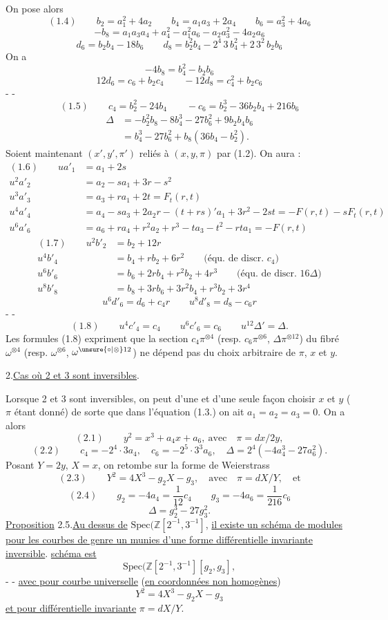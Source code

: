 On pose alors
\[
(1.4)\qquad b_2=a_1^2+4a_2\qquad b_4=a_1a_3+2a_4\qquad b_6=a_3^2+4a_6
\]
\[
-b_8=a_1a_3a_4+a_4^2-a_1^2a_6-a_2a_3^2-4a_2a_6
\]
\[
d_6=b_2b_4-18b_6\qquad d_8=b_2^2b_4-2^4\,3\,b_4^2+2\,3^2\,b_2b_6
\]
On a
\[
-4b_8=b_4^2-b_2b_6
\]
\[
12d_6=c_6+b_2c_4\qquad -12d_8=c_4^2+b_2c_6
\]
-  -
\[
(1.5)\qquad c_4=b_2^2-24b_4\qquad -c_6=b_2^3-36b_2b_4+216b_6
\]
\[
\begin{aligned}
\Delta&=-b_2^2b_8-8b_4^3-27b_6^2+9b_2b_4b_6\\
&=b_4^3-27b_6^2+b_8(36b_4-b_2^2).
\end{aligned}
\]
Soient maintenant $(x',y',\pi')$ reliés à $(x,y,\pi)$ par (1.2). On aura :
\[
\begin{aligned}
(1.6)\qquad ua'_1&=a_1+2s\\
u^2a'_2&=a_2-sa_1+3r-s^2\\
u^3a'_3&=a_3+ra_1+2t=F_t(r,t)\\
u^4a'_4&=a_4-sa_3+2a_2r-(t+rs)'a_1+3r^2-2st=-F(r,t)-sF_t(r,t)\\
u^6a'_6&=a_6+ra_4+r^2a_2+r^3-ta_3-t^2-rta_1=-F(r,t)
\end{aligned}
\]
\[
\begin{aligned}
(1.7)\qquad u^2b'_2&=b_2+12r\\
u^4b'_4&=b_4+rb_2+6r^2\qquad\text{(équ. de discr. }c_4\text{)}\\
u^6b'_6&=b_6+2rb_4+r^2b_2+4r^3\qquad\text{(équ. de discr. }16\Delta\text{)}\\
u^8b'_8&=b_8+3rb_6+3r^2b_4+r^3b_2+3r^4
\end{aligned}
\]
\[
u^6d'_6=d_6+c_4r\qquad u^8d'_8=d_8-c_6r
\]
-  -
\[
(1.8)\qquad u^4c'_4=c_4\qquad u^6c'_6=c_6\qquad u^{12}\Delta'=\Delta.
\]
Les formules (1.8) expriment que la section $c_4\pi^{\otimes4}$ (resp. $c_6\pi^{\otimes6}$,  $\Delta\pi^{\otimes12}$) du fibré $\omega^{\otimes4}$ (resp. $\omega^{\otimes6}$, $\omega^{\unsure{\circ|\otimes}12}$) ne dépend pas du choix arbitraire de $\pi$, $x$ et $y$.

2.\quad \uline{Cas où 2 et 3 sont inversibles}.

Lorsque 2 et 3 sont inversibles, on peut d'une et d'une seule façon choisir $x$ et $y$ ($\pi$ étant donné) de sorte que dans l'équation (1.3.) on ait $a_1=a_2=a_3=0$. On a alors
\[
(2.1)\qquad y^2=x^3+a_4x+a_6,\ \text{avec}\quad\pi=dx/2y,
\]
\[
(2.2)\qquad c_4=-2^4\cdot3a_4,\quad c_6=-2^5\cdot3^3a_6,\quad\Delta=2^4(-4a_4^3-27a_6^2).
\]
Posant $Y=2y$, $X=x$, on retombe sur la forme de Weierstrass
\[
(2.3)\qquad Y^2=4X^3-g_2X-g_3,\quad\text{avec}\quad\pi=dX/Y,\quad\text{et}
\]
\[
(2.4)\qquad g_2=-4a_4=\frac1{12}c_4\qquad g_3=-4a_6=\frac1{216}c_6
\]
\[
\Delta=g_2^3-27g_3^2.
\]
\uline{Proposition} 2.5.\quad \uline{Au dessus de} $\mathrm{Spec}(\mathbb Z[2^{-1},3^{-1}]$, \uline{il existe un schéma de modules pour les courbes de genre un munies d'une forme différentielle invariante inversible}. \uline{ schéma est}
\[
\mathrm{Spec}(\mathbb Z[2^{-1},3^{-1}][g_2,g_3],
\]
-  -
\uline{avec pour courbe universelle} (\uline{en coordonnées non homogènes}) \inserted{\unsure{$\rho$}}
\[
Y^2=4X^3-g_2X-g_3
\]
\uline{et pour différentielle invariante} $\pi=dX/Y$.

